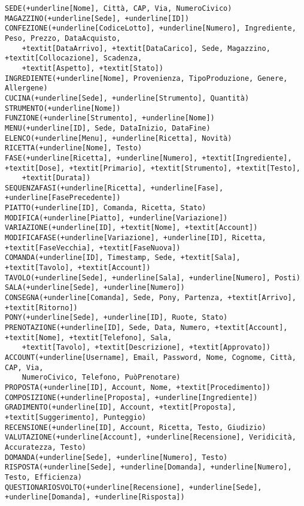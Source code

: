 \begin{Verbatim}[commandchars=+\[\]]
SEDE(+underline[Nome], Città, CAP, Via, NumeroCivico)
MAGAZZINO(+underline[Sede], +underline[ID])
CONFEZIONE(+underline[CodiceLotto], +underline[Numero], Ingrediente, Peso, Prezzo, DataAcquisto,
    +textit[DataArrivo], +textit[DataCarico], Sede, Magazzino, +textit[Collocazione], Scadenza,
    +textit[Aspetto], +textit[Stato])
INGREDIENTE(+underline[Nome], Provenienza, TipoProduzione, Genere, Allergene)
CUCINA(+underline[Sede], +underline[Strumento], Quantità)
STRUMENTO(+underline[Nome])
FUNZIONE(+underline[Strumento], +underline[Nome])
MENU(+underline[ID], Sede, DataInizio, DataFine)
ELENCO(+underline[Menu], +underline[Ricetta], Novità)
RICETTA(+underline[Nome], Testo)
FASE(+underline[Ricetta], +underline[Numero], +textit[Ingrediente], +textit[Dose], +textit[Primario], +textit[Strumento], +textit[Testo],
    +textit[Durata])
SEQUENZAFASI(+underline[Ricetta], +underline[Fase], +underline[FasePrecedente])
PIATTO(+underline[ID], Comanda, Ricetta, Stato)
MODIFICA(+underline[Piatto], +underline[Variazione])
VARIAZIONE(+underline[ID], +textit[Nome], +textit[Account])
MODIFICAFASE(+underline[Variazione], +underline[ID], Ricetta, +textit[FaseVecchia], +textit[FaseNuova])
COMANDA(+underline[ID], Timestamp, Sede, +textit[Sala], +textit[Tavolo], +textit[Account])
TAVOLO(+underline[Sede], +underline[Sala], +underline[Numero], Posti)
SALA(+underline[Sede], +underline[Numero])
CONSEGNA(+underline[Comanda], Sede, Pony, Partenza, +textit[Arrivo], +textit[Ritorno])
PONY(+underline[Sede], +underline[ID], Ruote, Stato)
PRENOTAZIONE(+underline[ID], Sede, Data, Numero, +textit[Account], +textit[Nome], +textit[Telefono], Sala,
    +textit[Tavolo], +textit[Descrizione], +textit[Approvato])
ACCOUNT(+underline[Username], Email, Password, Nome, Cognome, Città, CAP, Via,
    NumeroCivico, Telefono, PuòPrenotare)
PROPOSTA(+underline[ID], Account, Nome, +textit[Procedimento])
COMPOSIZIONE(+underline[Proposta], +underline[Ingrediente])
GRADIMENTO(+underline[ID], Account, +textit[Proposta], +textit[Suggerimento], Punteggio)
RECENSIONE(+underline[ID], Account, Ricetta, Testo, Giudizio)
VALUTAZIONE(+underline[Account], +underline[Recensione], Veridicità, Accuratezza, Testo)
DOMANDA(+underline[Sede], +underline[Numero], Testo)
RISPOSTA(+underline[Sede], +underline[Domanda], +underline[Numero], Testo, Efficienza)
QUESTIONARIOSVOLTO(+underline[Recensione], +underline[Sede], +underline[Domanda], +underline[Risposta])
\end{Verbatim}
